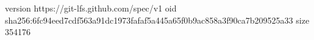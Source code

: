 version https://git-lfs.github.com/spec/v1
oid sha256:6fc94eed7cdf563a91dc1973fafaf5a445a65f0b9ac858a3f90ca7b209525a33
size 354176
